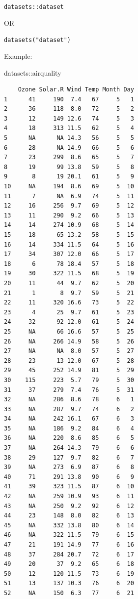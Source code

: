 \documentclass[
  letterpaper,
  DIV=11,
  numbers=noendperiod]{scrreprt}
\newenvironment{Shaded}{\begin{snugshade}}{\end{snugshade}}
\newcommand{\NormalTok}[1]{\textcolor[rgb]{0.00,0.23,0.31}{#1}}
\newcommand{\SpecialCharTok}[1]{\textcolor[rgb]{0.37,0.37,0.37}{#1}}
\begin{document}
\texttt{datasets::dataset}

OR

\texttt{datasets("dataset")}

Example:

\begin{Shaded}
\begin{Highlighting}[]
\NormalTok{datasets}\SpecialCharTok{::}\NormalTok{airquality}
\end{Highlighting}
\end{Shaded}

\begin{verbatim}
    Ozone Solar.R Wind Temp Month Day
1      41     190  7.4   67     5   1
2      36     118  8.0   72     5   2
3      12     149 12.6   74     5   3
4      18     313 11.5   62     5   4
5      NA      NA 14.3   56     5   5
6      28      NA 14.9   66     5   6
7      23     299  8.6   65     5   7
8      19      99 13.8   59     5   8
9       8      19 20.1   61     5   9
10     NA     194  8.6   69     5  10
11      7      NA  6.9   74     5  11
12     16     256  9.7   69     5  12
13     11     290  9.2   66     5  13
14     14     274 10.9   68     5  14
15     18      65 13.2   58     5  15
16     14     334 11.5   64     5  16
17     34     307 12.0   66     5  17
18      6      78 18.4   57     5  18
19     30     322 11.5   68     5  19
20     11      44  9.7   62     5  20
21      1       8  9.7   59     5  21
22     11     320 16.6   73     5  22
23      4      25  9.7   61     5  23
24     32      92 12.0   61     5  24
25     NA      66 16.6   57     5  25
26     NA     266 14.9   58     5  26
27     NA      NA  8.0   57     5  27
28     23      13 12.0   67     5  28
29     45     252 14.9   81     5  29
30    115     223  5.7   79     5  30
31     37     279  7.4   76     5  31
32     NA     286  8.6   78     6   1
33     NA     287  9.7   74     6   2
34     NA     242 16.1   67     6   3
35     NA     186  9.2   84     6   4
36     NA     220  8.6   85     6   5
37     NA     264 14.3   79     6   6
38     29     127  9.7   82     6   7
39     NA     273  6.9   87     6   8
40     71     291 13.8   90     6   9
41     39     323 11.5   87     6  10
42     NA     259 10.9   93     6  11
43     NA     250  9.2   92     6  12
44     23     148  8.0   82     6  13
45     NA     332 13.8   80     6  14
46     NA     322 11.5   79     6  15
47     21     191 14.9   77     6  16
48     37     284 20.7   72     6  17
49     20      37  9.2   65     6  18
50     12     120 11.5   73     6  19
51     13     137 10.3   76     6  20
52     NA     150  6.3   77     6  21

\end{verbatim}
\end{document}
